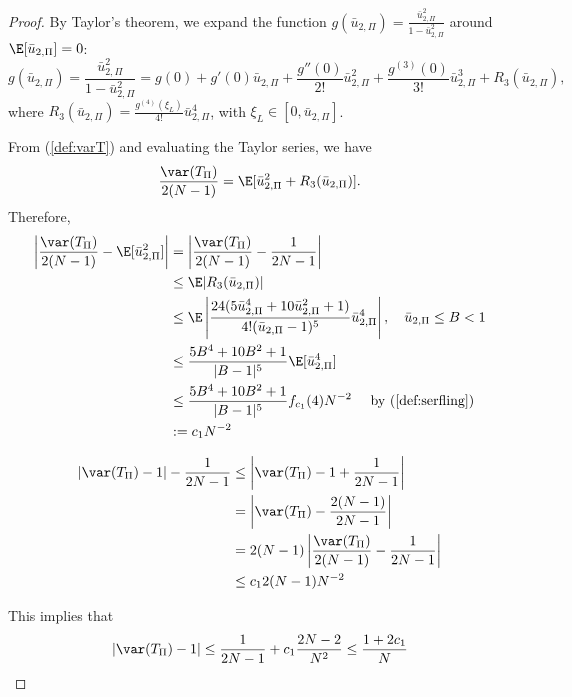 \begin{proof}
  By Taylor's theorem, we expand the function $g(\bar{u}_{2,\Pi}) =
  \frac{\bar{u}_{2,\Pi}^2}{1-\bar{u}_{2,\Pi}^2}$ around $\E[\bar{u}_{2,\Pi}] = 0$: 
  \begin{equation*}
    g(\bar{u}_{2,\Pi}) = \frac{\bar{u}_{2,\Pi}^2}{1-\bar{u}_{2,\Pi}^2} = g(0) + g'(0)
    \bar{u}_{2,\Pi} + \frac{g''(0)}{2!}\bar{u}_{2,\Pi}^2 +
    \frac{g^{(3)}(0)}{3!}\bar{u}_{2,\Pi}^3 + R_3(\bar{u}_{2,\Pi}),
  \end{equation*}
  where $R_3(\bar{u}_{2,\Pi}) = \frac{g^{(4)}(\xi_L)}{4!}\bar{u}_{2,\Pi}^4$, with
  $\xi_L \in [0, \bar{u}_{2,\Pi}]$.

  From (\ref{def:varT}) and evaluating the Taylor series, we have 
  \begin{equation*}
    \frac{\var(T_{\Pi})}{2(N-1)} = \E[\bar{u}_{2,\Pi}^2 + R_3(\bar{u}_{2,\Pi})].
  \end{equation*}
  Therefore,
  \begin{align*}
    \left | \frac{\var(T_{\Pi})}{2(N-1)} - \E[\bar{u}_{2,\Pi}^2] \right | 
    &= \left | \frac{\var(T_{\Pi})}{2(N-1)} - \frac{1}{2N-1} \right | \\
    &\leq  \E |R_3(\bar{u}_{2,\Pi})| \\
    &\leq \E \left | \frac{24(5\bar{u}_{2,\Pi}^4 + 10  \bar{u}_{2,\Pi}^2 +
        1)}{4!(\bar{u}_{2,\Pi}-1)^5}\bar{u}_{2,\Pi}^4  \right |, \quad
    \bar{u}_{2,\Pi} \leq B < 1 \\
    &\leq \frac{5B^4+10B^2+1}{|B-1|^5} \E [\bar{u}_{2,\Pi}^4] \\
    &\leq \frac{5B^4+10B^2+1}{|B-1|^5} f_{c_1}(4) N^{-2} \quad \text{
      by } (\ref{def:serfling}) \\
    &:= c_1 N^{-2}
  \end{align*}
  
  \begin{align*}
    |\var(T_{\Pi}) - 1| - \frac{1}{2N-1} 
    &\leq \left | \var(T_{\Pi}) - 1 + \frac{1}{2N-1} \right | \\
    &= \left | \var(T_{\Pi}) - \frac{2(N-1)}{2N-1} \right | \\
    &= 2(N-1) \left | \frac{\var(T_{\Pi})}{2(N-1)} - \frac{1}{2N-1} \right | \\
    &\leq c_1 2(N-1)N^{-2}
  \end{align*}
  
  This implies that 
  \begin{equation*}
    |\var(T_{\Pi}) - 1| \leq \frac{1}{2N-1} + c_1 \frac{2N-2}{N^2} \leq
    \frac{1 + 2c_1}{N}
  \end{equation*}
\end{proof}

